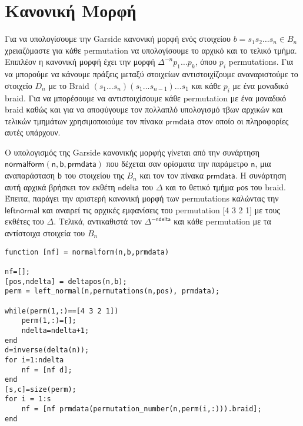 \documentclass[a4paper,11pt]{article}
\newcommand\ntext[1]{\ensuremath{\mathsf{#1}}}
\begin{document}

\section{Κανονική Μορφή}

Για να υπολογίσουμε την Garside κανονική μορφή ενός στοιχείου $ b=s_1s_2\dots s_n \in B_n$
χρειαζόμαστε για κάθε permutation να υπολογίσουμε το αρχικό και το τελικό τμήμα.
Επιπλέον η κανονική μορφή έχει την μορφή $\Delta^{-n}p_1\dots p_k$, όπου $ p_i $ permutations. Για να μπορούμε να κάνουμε πράξεις μεταξύ στοιχείων αντιστοιχίζουμε αναναριστούμε το στοιχείο $ D_n$ με 
το Braid $ (s_1\dots s_n)(s_1\dots s_{n-1}) \dots s_1 $ και κάθε $ p_i $ με ένα μοναδικό braid. 
Για να μπορέσουμε να αντιστοιχίσουμε κάθε permutation με ένα μοναδικό braid καθώς και για να αποφύγουμε τον πολλαπλό υπολογισμό τβων αρχικών και τελικών τμημάτων χρησιμοποιούμε τον πίνακα \ntext{prmdata} στον οποίο οι πληροφορίες αυτές υπάρχουν.


Ο υπολογισμός της Garside κανονικής μορφής γίνεται από την συνάρτηση \ntext{normalform(n,b,prmdata)} που δέχεται σαν ορίσματα την παράμετρο \ntext{n}, μια αναπαράσταση \ntext{b} του στοιχείου της $ B_n $ και τον τον πίνακα \ntext{prmdata}.
Η συνάρτηση αυτή αρχικά βρήσκει τον εκθέτη \ntext{ndelta} του $ \Delta $ και το θετικό τμήμα \ntext{pos} του braid. Έπειτα, παράγει την αριστερή κανονική μορφή των permutations καλώντας την \ntext{leftnormal} και αναιρεί τις αρχικές εμφανίσεις του permutation [4 3 2 1] με τους εκθέτες του $ \Delta $. Τελικά, αντικαθιστά τον $ \Delta^{-\ntext{ndelta}} $ και κάθε permutation με τα αντίστοιχα στοιχεία του $ B_n $
\begin{lstlisting}
function [nf] = normalform(n,b,prmdata)

nf=[];
[pos,ndelta] = deltapos(n,b);
perm = left_normal(n,permutations(n,pos), prmdata);

while(perm(1,:)==[4 3 2 1])
    perm(1,:)=[];
    ndelta=ndelta+1;
end
d=inverse(delta(n));
for i=1:ndelta
    nf = [nf d];
end
[s,c]=size(perm);
for i = 1:s
    nf = [nf prmdata(permutation_number(n,perm(i,:))).braid];
end
\end{lstlisting}
\end{document}
